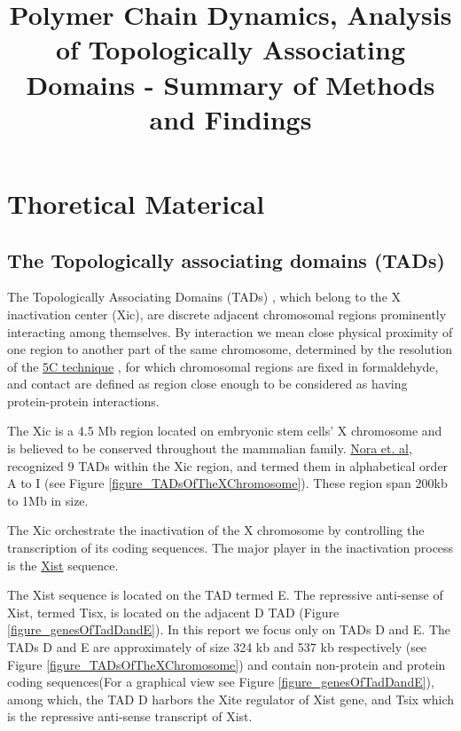 \documentclass[12pt]{book}
\begin{document}
\title{Polymer Chain Dynamics, Analysis of Topologically Associating Domains - Summary of Methods and Findings}
\maketitle
\tableofcontents

\chapter{Thoretical Materical} \label{chapter_theoreticalMaterial}

\section{The Topologically associating domains (TADs)}\label{section_theTADs}
The Topologically Associating Domains (TADs) \cite{nora2012spatial}, which belong to the X inactivation center (Xic), are discrete adjacent chromosomal regions prominently interacting among themselves. By interaction we mean close physical proximity of one region to another part of the same chromosome, determined by the resolution of the \href{http://en.wikipedia.org/wiki/Chromosome_conformation_capture#Carbon-Copy_Chromosome_Conformation_Capture_.285C.29}{5C technique} \cite{dostie2006chromosome} \cite{de2012decade}, for which chromosomal regions are fixed in formaldehyde, and contact are defined as region close enough to be considered as having protein-protein interactions.

The Xic is a 4.5 Mb region located on embryonic stem cells' X chromosome and is believed to be conserved throughout the mammalian family.  \href{http://www.nature.com/nature/journal/v485/n7398/full/nature11049.html}{Nora et. al}\cite{nora2012spatial}, recognized 9 TADs within the Xic region, and termed them in alphabetical order A to I (see Figure \ref{figure_TADsOfTheXChromosome}). These region span 200kb to 1Mb in size. 

The Xic orchestrate the inactivation of the X chromosome by controlling the transcription of its coding sequences. The major player in the inactivation process is the \href{http://en.wikipedia.org/wiki/XIST_(gene)#cite_note-2}{Xist} sequence.  

The Xist sequence is located on the TAD termed E. The repressive anti-sense of Xist, termed Tisx, is located on the adjacent D TAD (Figure \ref{figure_genesOfTadDandE}). In this report we focus only on TADs D and E. The TADs D and E are approximately of size 324 kb and 537 kb respectively (see Figure \ref{figure_TADsOfTheXChromosome}) and contain non-protein and protein coding sequences(For a graphical view see Figure \ref{figure_genesOfTadDandE}), among which, the TAD D harbors the Xite regulator of Xist gene, and Tsix which is the repressive anti-sense transcript of Xist. 
\end{document}
